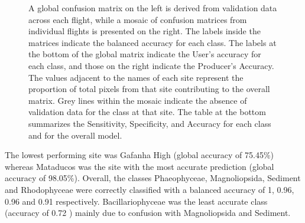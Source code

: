 \documentclass[
  number]{elsarticle}
\begin{document}
\label{cell-fig-Validation}
\begin{figure}[H]


\caption{\label{fig-Validation}A global confusion matrix on the left is
derived from validation data across each flight, while a mosaic of
confusion matrices from individual flights is presented on the right.
The labels inside the matrices indicate the balanced accuracy for each
class. The labels at the bottom of the global matrix indicate the User's
accuracy for each class, and those on the right indicate the Producer's
Accuracy. The values adjacent to the names of each site represent the
proportion of total pixels from that site contributing to the overall
matrix. Grey lines within the mosaic indicate the absence of validation
data for the class at that site. The table at the bottom summarizes the
Sensitivity, Specificity, and Accuracy for each class and for the
overall model.}

\end{figure}%

The lowest performing site was Gafanha High (global accuracy of 75.45\%)
whereas Mataducos was the site with the most accurate prediction (global
accuracy of 98.05\%). Overall, the classes Phaeophyceae, Magnoliopsida,
Sediment and Rhodophyceae were correctly classified with a balanced
accuracy of 1, 0.96, 0.96 and 0.91 respectively. Bacillariophyceae was
the least accurate class (accuracy of 0.72 ) mainly due to confusion
with Magnoliopsida and Sediment.
\end{document}
